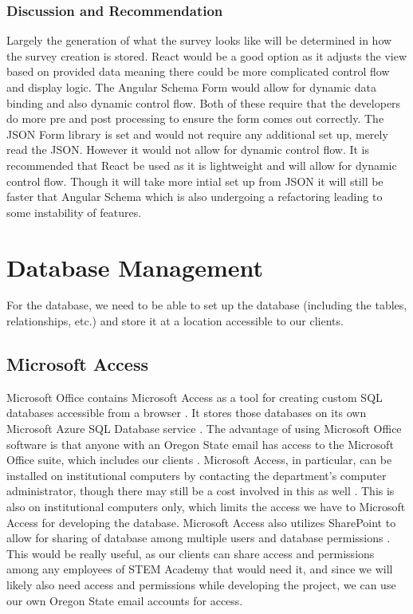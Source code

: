 \documentclass[letterpaper,10pt,serif, draftclsnofoot,onecolumn, compsoc, titlepage]{IEEEtran}
\begin{document}
\subsubsection{Discussion and Recommendation}
Largely the generation of what the survey looks like will be determined in how the survey creation is stored. React would be a good option as it adjusts the view based on provided data meaning there could be more complicated control flow and display logic. The Angular Schema Form would allow for dynamic data binding and also dynamic control flow. Both of these require that the developers do more pre and post processing to ensure the form comes out correctly. The JSON Form library is set and would not require any additional set up, merely read the JSON. However it would not allow for dynamic control flow. It is recommended that React be used as it is lightweight and will allow for dynamic control flow. Though it will take more intial set up from JSON it will still be faster that Angular Schema which is also undergoing a refactoring leading to some instability of features. 

\section{Database Management}
For the database, we need to be able to set up the database (including the tables, relationships, etc.) and store it at a location accessible to our clients.
\subsection{Microsoft Access}
Microsoft Office contains Microsoft Access as a tool for creating custom SQL databases accessible from a browser \cite{access}.
It stores those databases on its own Microsoft Azure SQL Database service \cite{access}.
The advantage of using Microsoft Office software is that anyone with an Oregon State email has access to the Microsoft Office suite, which includes our clients \cite{microsoftsoftware}.
Microsoft Access, in particular, can be installed on institutional computers by contacting the department's computer administrator, though there may still be a cost involved in this as well \cite{microsoftsoftware}.
This is also on institutional computers only, which limits the access we have to Microsoft Access for developing the database.
Microsoft Access also utilizes SharePoint to allow for sharing of database among multiple users and database permissions \cite{access}.
This would be really useful, as our clients can share access and permissions among any employees of STEM Academy that would need it, and since we will likely also need access and permissions while developing the project, we can use our own Oregon State email accounts for access.
\end{document}
